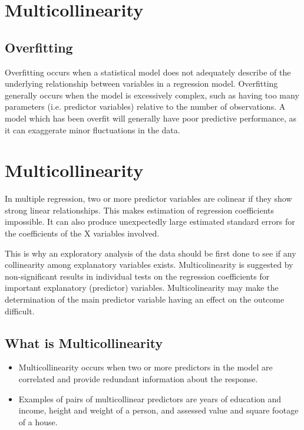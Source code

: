 \documentclass[a4paper,12pt]{article}
\begin{document}
\section*{Multicollinearity}
\subsection*{Overfitting}
Overfitting occurs when a statistical model does not adequately describe of the underlying
relationship between variables in a regression model. Overfitting generally occurs when the
model is excessively complex, such as having too many parameters (i.e. predictor variables)
relative to the number of observations. A model which has been overfit will generally have poor
predictive performance, as it can exaggerate minor fluctuations in the data.




\section{Multicollinearity}
In multiple regression, two or more predictor variables are colinear if they show strong linear relationships. This makes estimation of regression coefficients impossible. It can also produce unexpectedly large estimated standard errors for the coefficients of the X variables involved.

This is why an exploratory analysis of the data should be first done to see if any collinearity among explanatory variables exists. Multicolinearity is suggested by non-significant results in individual tests on the regression coefficients for important explanatory (predictor) variables. Multicolinearity may make the determination of the main predictor variable having an effect on the outcome difficult.

\subsection*{What is Multicollinearity}
\begin{itemize}

\item Multicollinearity occurs when two or more predictors in the model are correlated
and provide redundant information about the response.
\item  Examples of pairs of multicollinear predictors are years of education and income, height and weight of a
person, and assessed value and square footage of a house.

\end{itemize}
\end{document}
